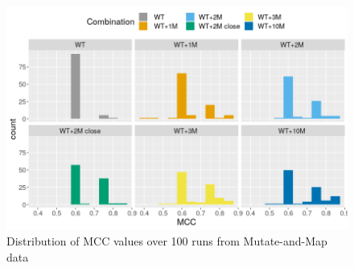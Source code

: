 \documentclass[11pt]{article} %
\begin{document}
\begin{figure}[H]
\includegraphics[width=\linewidth]{graphs/histog1}
\caption{Distribution of MCC values over 100 runs from Mutate-and-Map data}
\end{figure}


%


\end{document}
